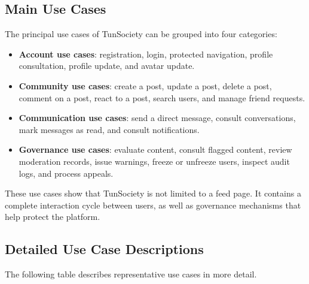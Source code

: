 \subsection{Main Use Cases}

The principal use cases of TunSociety can be grouped into four categories:

\begin{itemize}
    \item \textbf{Account use cases}: registration, login, protected navigation, profile consultation, profile update, and avatar update.
    \item \textbf{Community use cases}: create a post, update a post, delete a post, comment on a post, react to a post, search users, and manage friend requests.
    \item \textbf{Communication use cases}: send a direct message, consult conversations, mark messages as read, and consult notifications.
    \item \textbf{Governance use cases}: evaluate content, consult flagged content, review moderation records, issue warnings, freeze or unfreeze users, inspect audit logs, and process appeals.
\end{itemize}

These use cases show that TunSociety is not limited to a feed page. It contains a complete interaction cycle between users, as well as governance mechanisms that help protect the platform.

\subsection{Detailed Use Case Descriptions}

The following table describes representative use cases in more detail.

